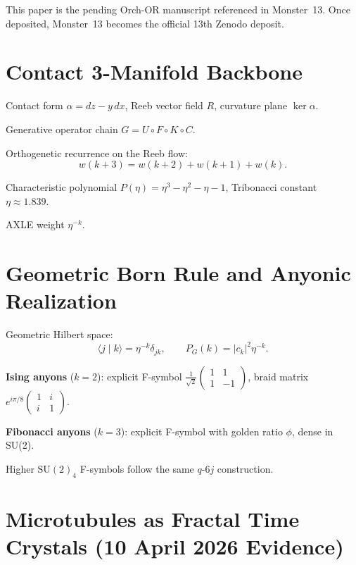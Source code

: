 \documentclass[11pt,a4paper]{article}
\theoremstyle{definition}
\theoremstyle{remark}
\begin{document}
This paper is the pending Orch-OR manuscript referenced in Monster~13. Once deposited,
Monster~13 becomes the official 13th Zenodo deposit.

\section{Contact 3-Manifold Backbone}

Contact form $\alpha=dz-y\,dx$, Reeb vector field $R$, curvature plane $\ker\alpha$.

Generative operator chain $G=U\circ F\circ K\circ C$.

Orthogenetic recurrence on the Reeb flow:
\[
  w(k+3)=w(k+2)+w(k+1)+w(k).
\]

Characteristic polynomial $P(\eta)=\eta^3-\eta^2-\eta-1$, Tribonacci constant $\eta\approx1.839$.

AXLE weight $\eta^{-k}$.

\section{Geometric Born Rule and Anyonic Realization}

Geometric Hilbert space:
\[
  \langle j\mid k\rangle=\eta^{-k}\delta_{jk},\qquad P_G(k)=|c_k|^2\eta^{-k}.
\]

\noindent\textbf{Ising anyons} ($k=2$): explicit F-symbol $\tfrac{1}{\sqrt{2}}\begin{pmatrix}1&1\\1&-1\end{pmatrix}$,
braid matrix $e^{i\pi/8}\begin{pmatrix}1&i\\i&1\end{pmatrix}$.

\noindent\textbf{Fibonacci anyons} ($k=3$): explicit F-symbol with golden ratio $\phi$, dense in SU(2).

Higher $\mathrm{SU}(2)_4$ F-symbols follow the same $q$-$6j$ construction.

\section{Microtubules as Fractal Time Crystals (10 April 2026 Evidence)}
\end{document}
